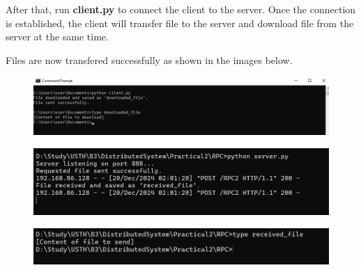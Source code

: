 \documentclass[12pt]{article}
\begin{document}
After that, run \textbf{client.py} to connect the client to the server. Once the connection is established, the client will transfer file to the server and download file from the server at the same time. 

Files are now transfered successfully as shown in the images below.

\begin{figure}[H]
    \includegraphics[scale=0.6]{test-client.png}
\end{figure}

\vspace{-0.7cm} %

\begin{figure}[H]
    \includegraphics[scale=0.6]{test-server-2.png}
\end{figure}

\vspace{-0.7cm} %

\begin{figure}[H]
    \includegraphics[scale=0.6]{test-server-3.png}
\end{figure}
\end{document}
